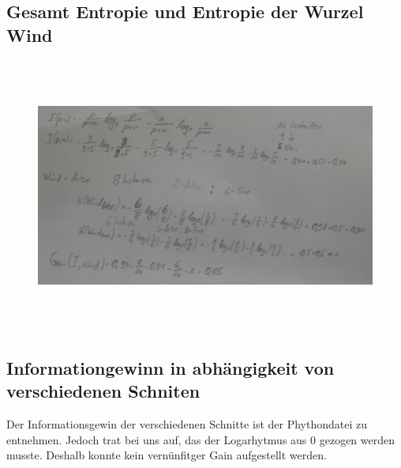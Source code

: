 \subsection{Gesamt Entropie und Entropie der Wurzel Wind}

\begin{figure}[H]
  \centering
  \includegraphics[height=9cm]{A3.jpeg}
\end{figure}

\subsection{Informationgewinn in abhängigkeit von verschiedenen Schniten}
Der Informationsgewin der verschiedenen Schnitte ist der Phythondatei zu entnehmen. Jedoch trat bei uns auf, das der Logarhytmus aus 0 gezogen werden musste. Deshalb konnte kein vernünfitger Gain aufgestellt werden.
